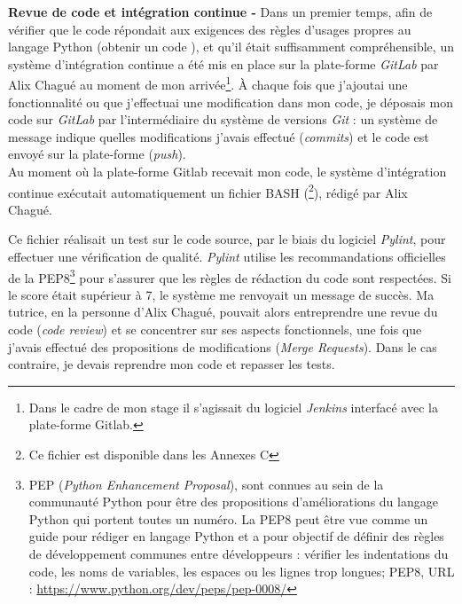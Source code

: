 \textbf{Revue de code et intégration continue - }Dans un premier temps, afin de vérifier que le code répondait aux exigences des règles d'usages propres au langage Python (obtenir un code ), et qu'il était suffisamment compréhensible, un système d'intégration continue a été mis en place sur la plate-forme \textit{GitLab} par Alix Chagué au moment de mon arrivée\footnote{Dans le cadre de mon stage il s'agissait du logiciel \textit{Jenkins} interfacé avec la plate-forme Gitlab.}. À chaque fois que j'ajoutai une fonctionnalité ou que j'effectuai une modification dans mon code, je déposais mon code sur \textit{GitLab} par l'intermédiaire du système de versions \textit{Git} : un système de message indique quelles modifications j'avais effectué (\textit{commits}) et le code est envoyé sur la plate-forme (\textit{push}).\\

Au moment où la plate-forme Gitlab recevait mon code, le système d'intégration continue exécutait automatiquement un fichier BASH (\footnote{Ce fichier est disponible dans les Annexes C}), rédigé par Alix Chagué. 

Ce fichier réalisait un test sur le code source, par le biais du logiciel \textit{Pylint}, pour effectuer une vérification de qualité. \textit{Pylint} utilise les recommandations officielles de la PEP8\footnote{PEP (\textit{Python Enhancement Proposal}), sont connues au sein de la communauté Python pour être des propositions d'améliorations du langage Python qui portent toutes un numéro. La PEP8 peut être vue comme un guide pour rédiger en langage Python et a pour objectif de définir des règles de développement communes entre développeurs : vérifier les indentations du code, les noms de variables, les espaces ou les lignes trop longues; PEP8, URL : \url{https://www.python.org/dev/peps/pep-0008/}} pour s'assurer que les règles de rédaction du code sont respectées. Si le score était supérieur à 7, le système me renvoyait un message de succès. Ma tutrice, en la personne d'Alix Chagué, pouvait alors entreprendre une revue  du code (\textit{code review}) et se concentrer sur ses aspects fonctionnels, une fois que j'avais effectué des propositions de modifications (\textit{Merge Requests}). Dans le cas contraire, je devais reprendre mon code et repasser les tests. 

